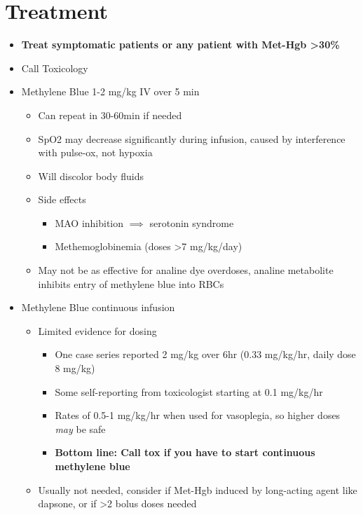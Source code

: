 \documentclass[main.tex]{subfiles}
\begin{document}
\section{Treatment}
\begin{itemize}[noitemsep]
	\item \textbf{Treat symptomatic patients or any patient with Met-Hgb \textgreater 30\%}
	\item Call Toxicology
	\item Methylene Blue 1-2 mg/kg IV over 5 min
	\begin{itemize}[noitemsep]
		\item Can repeat in 30-60min if needed
		\item SpO2 may decrease significantly during infusion, caused by interference with pulse-ox, not hypoxia
		\item Will discolor body fluids
		\item Side effects
		\begin{itemize}[noitemsep]
			\item MAO inhibition $\implies$ serotonin syndrome
			\item Methemoglobinemia (doses \textgreater 7 mg/kg/day) 
		\end{itemize}
		\item May not be as effective for analine dye overdoses, analine metabolite inhibits entry of methylene blue into RBCs
	\end{itemize}
	
	\item Methylene Blue continuous infusion
	\begin{itemize}[noitemsep]
		\item Limited evidence for dosing
		\begin{itemize}[noitemsep]
			\item One case series reported 2 mg/kg over 6hr (0.33 mg/kg/hr, daily dose 8 mg/kg) 
			\item Some self-reporting from toxicologist starting at 0.1 mg/kg/hr
			\item Rates of 0.5-1 mg/kg/hr when used for vasoplegia, so higher doses \textit{may} be safe
			\item \textbf{Bottom line: Call tox if you have to start continuous methylene blue}
		\end{itemize}
		\item Usually not needed, consider if Met-Hgb induced by long-acting agent like dapsone, or if \textgreater 2 bolus doses needed
	\end{itemize}
	

\end{itemize}
\end{document}
